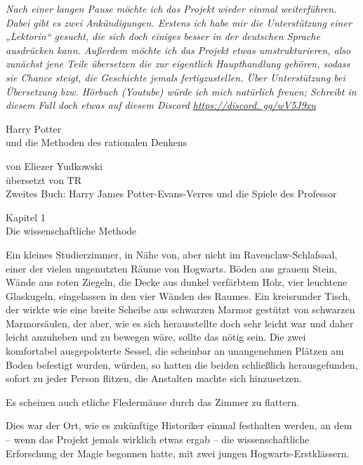 

\hypertarget{die-wissenschaftliche-methode}{%

\emph{Nach einer langen Pause möchte ich das Projekt wieder einmal weiterführen. Dabei gibt es zwei Ankündigungen. Erstens ich habe mir die Unterstützung einer „Lektorin“ gesucht, die sich doch einiges besser in der deutschen Sprache ausdrücken kann. Außerdem möchte ich das Projekt etwas umstrukturieren, also zunächst jene Teile übersetzen die zur eigentlich Haupthandlung gehören, sodass sie Chance steigt, die Geschichte jemals fertigzustellen. Über Unterstützung bei Übersetzung bzw. Hörbuch (Youtube) würde ich mich natürlich freuen; Schreibt in diesem Fall doch etwas auf diesem Discord \href{https://discord.\%20gg/wV5J9xu“\%20target=}{https://discord. gg/wV5J9xu} ~}

Harry Potter\\ und die Methoden des rationalen Denkens

von Eliezer Yudkowski\\ übersetzt von TR\\ Zweites Buch: Harry James Potter-Evans-Verres und die Spiele des Professor

Kapitel 1\\ Die wissenschaftliche Methode

Ein kleines Studierzimmer, in Nähe von, aber nicht im Ravenclaw-Schlafsaal, einer der vielen ungenutzten Räume von Hogwarts. Böden aus grauem Stein, Wände aus roten Ziegeln, die Decke aus dunkel verfärbtem Holz, vier leuchtene Glaskugeln, eingelassen in den vier Wänden des Raumes. Ein kreisrunder Tisch, der wirkte wie eine breite Scheibe aus schwarzen Marmor gestützt von schwarzen Marmorsäulen, der aber, wie es sich herausstellte doch sehr leicht war und daher leicht anzuheben und zu bewegen wäre, sollte das nötig sein. Die zwei komfortabel ausgepolsterte Sessel, die scheinbar an unangenehmen Plätzen am Boden befestigt wurden, würden, so hatten die beiden schließlich herausgefunden, sofort zu jeder Person flitzen, die Anstalten machte sich hinzusetzen.

Es scheinen auch etliche Fledermäuse durch das Zimmer zu flattern.

Dies war der Ort, wie es zukünftige Historiker einmal festhalten werden, an dem -- wenn das Projekt jemals wirklich etwas ergab -- die wissenschaftliche Erforschung der Magie begonnen hatte, mit zwei jungen Hogwarts-Erstklässern.

}
